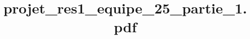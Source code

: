 \documentclass[a4paper,12pt]{article}
\begin{document}
\title{projet_res1_equipe_25_partie_1.pdf}

  

\newpage

\tableofcontents

\newpage

\listoffigures

\newpage



\newpage

 
\end{document}

